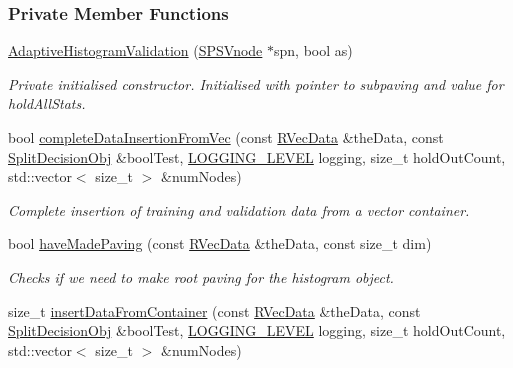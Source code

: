 \subsubsection*{\-Private \-Member \-Functions}
\begin{DoxyCompactItemize}
\item 
\hyperlink{classsubpavings_1_1AdaptiveHistogramValidation_a7bebcc83720d315cbbb8c8ab85d7a945}{\-Adaptive\-Histogram\-Validation} (\hyperlink{classsubpavings_1_1SPSVnode}{\-S\-P\-S\-Vnode} $\ast$spn, bool as)
\begin{DoxyCompactList}\small\item\em \-Private initialised constructor. \-Initialised with pointer to subpaving and value for hold\-All\-Stats. \end{DoxyCompactList}\item 
bool \hyperlink{classsubpavings_1_1AdaptiveHistogramValidation_acf7246052d9032f41a4f237f1b5207d9}{complete\-Data\-Insertion\-From\-Vec} (const \hyperlink{namespacesubpavings_a30e15e24c8d81a2160d7422ef3c39d68}{\-R\-Vec\-Data} \&the\-Data, const \hyperlink{classsubpavings_1_1SplitDecisionObj}{\-Split\-Decision\-Obj} \&bool\-Test, \hyperlink{namespacesubpavings_aef8e51096b59ecaf1a1e9b2ee24b6089}{\-L\-O\-G\-G\-I\-N\-G\-\_\-\-L\-E\-V\-E\-L} logging, size\-\_\-t hold\-Out\-Count, std\-::vector$<$ size\-\_\-t $>$ \&num\-Nodes)
\begin{DoxyCompactList}\small\item\em \-Complete insertion of training and validation data from a vector container. \end{DoxyCompactList}\item 
bool \hyperlink{classsubpavings_1_1AdaptiveHistogramValidation_a7b6e78d7a069536dd096e81c6e3d8e1f}{have\-Made\-Paving} (const \hyperlink{namespacesubpavings_a30e15e24c8d81a2160d7422ef3c39d68}{\-R\-Vec\-Data} \&the\-Data, const size\-\_\-t dim)
\begin{DoxyCompactList}\small\item\em \-Checks if we need to make root paving for the histogram object. \end{DoxyCompactList}\item 
size\-\_\-t \hyperlink{classsubpavings_1_1AdaptiveHistogramValidation_ac57fa83d1ec2fc1e9cf1565c9cc07f91}{insert\-Data\-From\-Container} (const \hyperlink{namespacesubpavings_a30e15e24c8d81a2160d7422ef3c39d68}{\-R\-Vec\-Data} \&the\-Data, const \hyperlink{classsubpavings_1_1SplitDecisionObj}{\-Split\-Decision\-Obj} \&bool\-Test, \hyperlink{namespacesubpavings_aef8e51096b59ecaf1a1e9b2ee24b6089}{\-L\-O\-G\-G\-I\-N\-G\-\_\-\-L\-E\-V\-E\-L} logging, size\-\_\-t hold\-Out\-Count, std\-::vector$<$ size\-\_\-t $>$ \&num\-Nodes)

\end{DoxyCompactItemize}
